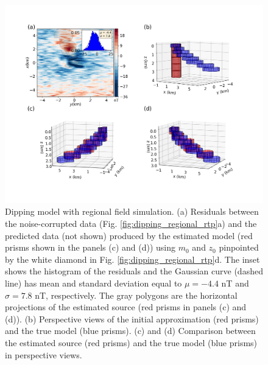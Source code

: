 \begin{figure}
    \centering
    \includegraphics[width=\linewidth]{figures/regional-l2-solution.png}
    \caption{Dipping model with regional field simulation. (a) Residuals between the  noise-corrupted data (Fig. \ref{fig:dipping_regional_rtp}a) and the predicted data (not shown) produced by the estimated model (red prisms shown in the panels (c) and (d)) using 
$m_0$  and $z_0$ pinpointed by the white diamond in Fig. \ref{fig:dipping_regional_rtp}d.
The inset shows the histogram of the residuals and the Gaussian curve (dashed line) has mean and standard deviation equal   to $\mu = -4.4$ nT and $\sigma=7.8$ nT, respectively. 
    The gray polygons are the horizontal projections of the estimated source (red prisms in panels (c) and (d)).
     (b) Perspective views of the initial approximation (red prisms) and the true model (blue prisms). 
     (c) and (d) Comparison between the estimated source (red prisms) and the true model (blue prisms) in perspective views.     
}
    \label{fig:regional-results}
\end{figure}


